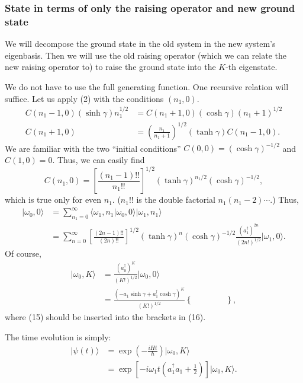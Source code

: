 \documentclass[12pt]{article}
\begin{document}
\subsubsection*{State in terms of only the raising operator and new ground state}

We will decompose the ground state in the old system in the new system's eigenbasis.  Then we will use the old raising operator (which we can relate the new raising operator to) to raise the ground state into the $K$-th eigenstate. 

We do not have to use the full generating function.  One recursive relation will suffice.  Let us apply (2) with the conditions $(n_1, 0)$.  
\begin{align*}
	C(n_1-1,0)(\sinh \gamma)n_1^{1/2} &= C(n_1+1,0)(\cosh \gamma)(n_1+1)^{1/2} \\
	C(n_1+1,0) &= \left( \frac{n_1}{n_1+1} \right)^{1/2} (\tanh \gamma) C(n_1-1,0).
\end{align*}
We are familiar with the two ``initial conditions'' $C(0,0) = (\cosh\gamma)^{-1/2}$ and $C(1,0) = 0$.  Thus, we can easily find
\begin{equation}
	C(n_1,0) = \left[ \frac{(n_1-1)!!}{n_1!!} \right]^{1/2} (\tanh \gamma)^{n_1/2} (\cosh \gamma)^{-1/2},
\end{equation}
which is true only for even $n_1$.  ($n_1!!$ is the double factorial $n_1(n_1-2)\cdots$.)  Thus,
\begin{align}
	|\omega_0,0\rangle &= \sum_{n_1=0}^{\infty} \langle \omega_1,n_1|\omega_0,0\rangle |\omega_1,n_1\rangle \nonumber  \\
			   &= \sum_{n = 0}^{\infty} \left[ \frac{(2n-1)!!}{(2n)!!} \right]^{1/2} (\tanh \gamma)^n (\cosh \gamma)^{-1/2} \frac{(a_1^{\dagger})^{2n}}{(2n!)^{1/2}} |\omega_1,0\rangle . 
\end{align}
Of course,
\begin{align}
	|\omega_0, K\rangle &= \frac{(a_0^{\dagger})^{K}}{(K!)^{1/2}}|\omega_0,0\rangle \\
			    &= \frac{(-a_1\sinh\gamma + a_1^{\dagger}\cosh \gamma)^{K}}{(K!)^{1/2}}\left\{ \qquad \qquad \right\}, 
\end{align}
where (15) should be inserted into the brackets in (16).

The time evolution is simply:
\begin{align*}
	|\psi(t)\rangle  &= \exp\left( -\frac{iHt}{\hbar} \right) |\omega_0, K\rangle \\
			 &= \exp \left[ -i\omega_1 t \left(a_1^{\dagger}a_1 + \frac{1}{2}\right) \right] |\omega_0,K\rangle .
\end{align*}
\end{document}
